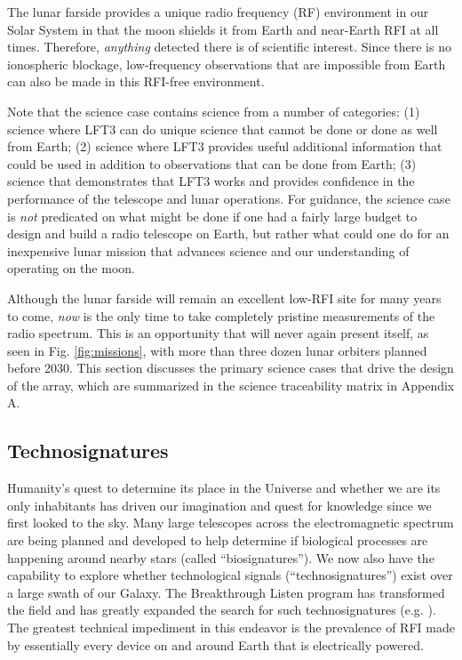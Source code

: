 The lunar farside provides a unique radio frequency (RF) environment in our Solar System in that the moon shields it from Earth and near-Earth RFI at all times. Therefore, {\em anything} detected there is of scientific interest. Since there is no ionospheric blockage, low-frequency observations that are impossible from Earth can also be made in this RFI-free environment.

Note that the science case contains science from a number of categories:
(1) science where LFT3 can do unique science that cannot be done or done as well from Earth;
(2) science where LFT3 provides useful additional information that could be used in addition to observations that can be done from Earth;
(3) science that demonstrates that LFT3 works and provides confidence in the performance of the telescope and lunar operations.  For guidance, the science case is {\em not} predicated on what might be done if one had a fairly large budget to design and build a radio telescope on Earth, but rather what could one do for an inexpensive lunar mission that advances science and our understanding of operating on the moon.

Although the lunar farside will remain an excellent low-RFI site for many years to come, {\em now} is the only time to take completely pristine measurements of the radio spectrum. This is an opportunity that will never again present itself, as seen in Fig. \ref{fig:missions}, with more than three dozen lunar orbiters planned before 2030.  This section discusses the primary science cases that drive the design of the array, which are summarized in the science traceability matrix in Appendix A.

\subsection{Technosignatures}
Humanity's quest to determine its place in the Universe and whether we are its only inhabitants has driven our imagination and quest for knowledge since we first looked to the sky.  Many large telescopes across the electromagnetic spectrum are being planned and developed to help determine if biological processes are happening around nearby stars (called ``biosignatures'').  We now also have the capability to explore whether technological signals (``technosignatures'') exist over a large swath of our Galaxy.  The Breakthrough Listen program \citep{2016iac..conf34378W} has transformed the field and has greatly expanded the search for such technosignatures (e.g. \citealt{Enriquez_2017, Price_2020, Gajjar_2021}).  The greatest technical impediment in this endeavor is the prevalence of RFI made by essentially every device on and around Earth that is electrically powered.

